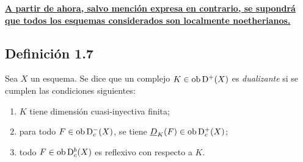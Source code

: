 \textbf{\uline{A partir de ahora, salvo mención expresa en contrario, se supondrá que todos los esquemas considerados son localmente noetherianos.}}

\subsection*{Definición 1.7}
Sea $X$ un esquema. Se dice que un complejo $K \in \operatorname{ob} \mathrm{D}^{+}(X)$ es \emph{dualizante} si se cumplen las condiciones siguientes:
\begin{enumerate}[label=(\roman*)]
\item $K$ tiene dimensión cuasi-inyectiva finita;
\item para todo $F \in \operatorname{ob} \mathrm{D}_c^{-}(X)$, se tiene $\underline{D}_K(F) \in \operatorname{ob} \mathrm{D}_c^{+}(X)$;
\item todo $F \in \operatorname{ob} \mathrm{D}_c^{b}(X)$ es reflexivo con respecto a $K$.
\end{enumerate}
